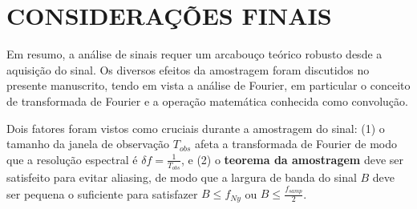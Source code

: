\chapter{CONSIDERAÇÕES FINAIS}

Em resumo, a análise de sinais requer um arcabouço teórico robusto desde a aquisição do sinal. Os diversos efeitos da amostragem foram discutidos no presente manuscrito, tendo em vista a análise de Fourier, em particular o conceito de transformada de Fourier e a operação matemática conhecida como convolução. 

Dois fatores foram vistos como cruciais durante a amostragem do sinal: (1) o tamanho da janela de observação $T_{obs}$ afeta a transformada de Fourier de modo que a resolução espectral é $\delta f = \frac{1}{T_{obs}}$, e (2) o \textbf{teorema da amostragem} deve ser satisfeito para evitar aliasing, de modo que a largura de banda do sinal $B$ deve ser pequena o suficiente para satisfazer $B \leq f_{Ny}$ ou $B \leq \frac{f_{samp}}{2}$.